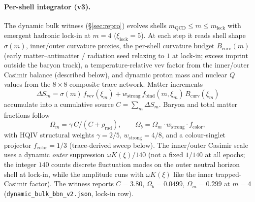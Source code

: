 \documentclass[11pt]{amsart}
\newcommand{\datafile}[1]{\texttt{#1}}
\begin{document}
\paragraph{Per-shell integrator (v3).}
The dynamic bulk witness (\S\ref{sec:repro}) evolves
shells $m_{\mathrm{QCD}}\le m\le m_{\mathrm{lock}}$ with emergent
hadronic lock-in at $m=4$ ($\xi_{\mathrm{lock}}=5$). At each step it
reads shell shape $\sigma(m)$, inner/outer curvature proxies, the
per-shell curvature budget $B_{\mathrm{curv}}(m)$ (early matter--antimatter /
radiation seed relaxing to $1$ at lock-in; excess imprint outside the baryon track),
a temperature-relative vev factor from the inner/outer Casimir balance
(described below), and dynamic proton mass and nuclear $Q$ values from
the $8\times8$ composite-trace network. Matter increments
\[
\Delta S_m = \sigma(m)\,f_{\mathrm{vev}}(\xi_m)
  + w_{\mathrm{strong}}\,f_{\mathrm{bind}}(m,\xi_m)\,B_{\mathrm{curv}}(\xi_m)
\]
accumulate into a cumulative source $C=\sum_m \Delta S_m$. Baryon and
total matter fractions follow
\[
\Omega_m = \gamma\, C/(C+\rho_{\mathrm{rad}}),
\qquad
\Omega_b = \Omega_m \cdot w_{\mathrm{strong}} \cdot f_{\mathrm{color}},
\]
with HQIV structural weights $\gamma=2/5$, $w_{\mathrm{strong}}=4/8$,
and a colour-singlet projector $f_{\mathrm{color}}=1/3$ (trace-derived
sweep below). The inner/outer Casimir scale uses a dynamic \emph{outer}
suppression $\omega K(\xi)/140$ (not a fixed $1/140$ at all epochs;
the integer $140$ counts discrete fluctuation modes on the outer
neutral horizon shell at lock-in, while the amplitude runs with
$\omega K(\xi)$ like the inner trapped-Casimir factor). The witness
reports $C=3.80$, $\Omega_b=0.0499$, $\Omega_m=0.299$ at $m=4$
(\datafile{dynamic\_bulk\_bbn\_v2.json}, lock-in row).
\end{document}
